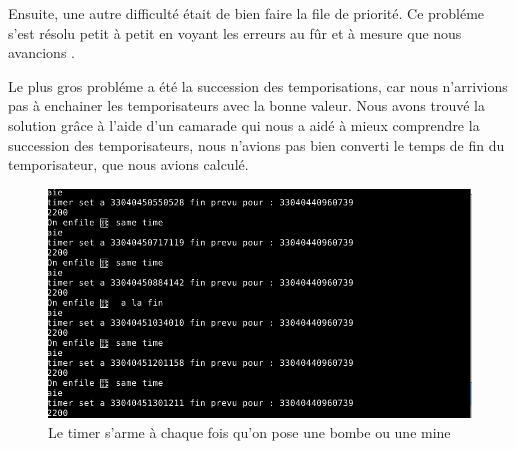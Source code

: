 \documentclass[a4paper]{article}
\begin{document}
Ensuite, une autre difficulté était de bien faire la file de priorité. Ce probléme s'est résolu petit à petit en voyant les erreurs au fûr et à mesure que nous avancions .

Le plus gros probléme a été la succession des temporisations, car nous n'arrivions pas à enchainer les temporisateurs avec la bonne valeur. Nous avons trouvé la solution grâce à l'aide d'un camarade qui nous a aidé à mieux comprendre la succession des temporisateurs, nous n'avions pas bien converti le temps de fin du temporisateur, que nous avions calculé.
\newline
\begin{figure}[!h]
  \includegraphics[scale=0.5]{probleme_timer.png}
  \caption{Le timer s'arme à chaque fois qu'on pose une bombe ou une mine}
\end{figure}
\end{document}
